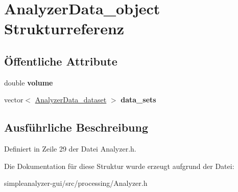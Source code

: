 \hypertarget{structAnalyzerData__object}{\section{Analyzer\-Data\-\_\-object Strukturreferenz}
\label{structAnalyzerData__object}
}
\subsection*{Öffentliche Attribute}
\begin{DoxyCompactItemize}
\item 
\hypertarget{structAnalyzerData__object_a3f697bd0d526805d353054a3b2589c98}{double {\bfseries volume}}\label{structAnalyzerData__object_a3f697bd0d526805d353054a3b2589c98}

\item 
\hypertarget{structAnalyzerData__object_a4b82dd4128ae84dbc0422a6155254e2e}{vector$<$ \hyperlink{structAnalyzerData__dataset}{Analyzer\-Data\-\_\-dataset} $>$ {\bfseries data\-\_\-sets}}\label{structAnalyzerData__object_a4b82dd4128ae84dbc0422a6155254e2e}

\end{DoxyCompactItemize}


\subsection{Ausführliche Beschreibung}


Definiert in Zeile 29 der Datei Analyzer.\-h.



Die Dokumentation für diese Struktur wurde erzeugt aufgrund der Datei\-:\begin{DoxyCompactItemize}
\item 
simpleanalyzer-\/gui/src/processing/Analyzer.\-h\end{DoxyCompactItemize}
